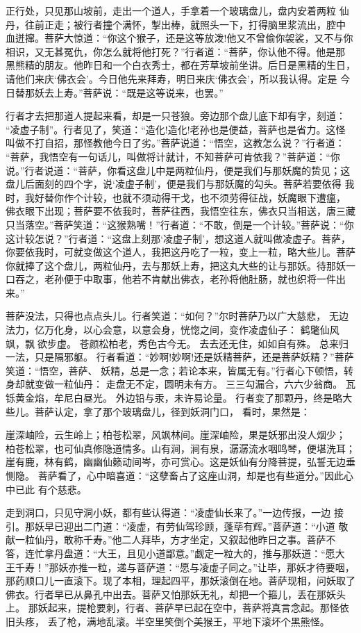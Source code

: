 正行处，只见那山坡前，走出一个道人，手拿着一个玻璃盘儿，盘内安着两粒
仙丹，往前正走；被行者撞个满怀，掣出棒，就照头一下，打得脑里浆流出，腔中
血迸撺。菩萨大惊道：“你这个猴子，还是这等放泼!他又不曾偷你袈裟，又不与你
相识，又无甚冤仇，你怎么就将他打死？”行者道：“菩萨，你认他不得。他是那
黑熊精的朋友。他昨日和一个白衣秀士，都在芳草坡前坐讲。后日是黑精的生日，
请他们来庆‘佛衣会’。今日他先来拜寿，明日来庆‘佛衣会’，所以我认得。定是
今日替那妖去上寿。”菩萨说：“既是这等说来，也罢。”

行者才去把那道人提起来看，却是一只苍狼。旁边那个盘儿底下却有字，刻道：
“凌虚子制”。行者见了，笑道：“造化!造化!老孙也是便益，菩萨也是省力。这怪
叫做不打自招，那怪教他今日了劣。”菩萨说道：“悟空，这教怎么说？”行者道：
“菩萨，我悟空有一句话儿，叫做将计就计，不知菩萨可肯依我？”菩萨道：“你
说。”行者说道：“菩萨，你看这盘儿中是两粒仙丹，便是我们与那妖魔的贽见；这
盘儿后面刻的四个字，说‘凌虚子制’，便是我们与那妖魔的勾头。菩萨若要依得
我时，我好替你作个计较，也就不须动得干戈，也不须劳得征战，妖魔眼下遭瘟，
佛衣眼下出现；菩萨要不依我时，菩萨往西，我悟空往东，佛衣只当相送，唐三藏
只当落空。”菩萨笑道：“这猴熟嘴！”行者道：“不敢，倒是一个计较。”菩萨说：“你
这计较怎说？”行者道：“这盘上刻那‘凌虚子制’，想这道人就叫做凌虚子。菩萨，
你要依我时，可就变做这个道人，我把这丹吃了一粒，变上一粒，略大些儿。菩萨
你就捧了这个盘儿，两粒仙丹，去与那妖上寿，把这丸大些的让与那妖。待那妖一
口吞之，老孙便于中取事，他若不肯献出佛衣，老孙将他肚肠，就也织将一件出来。”

菩萨没法，只得也点点头儿。行者笑道：“如何？”尔时菩萨乃以广大慈悲，
无边法力，亿万化身，以心会意，以意会身，恍惚之间，变作凌虚仙子：
鹤氅仙风飒，飘欲步虚。
苍颜松柏老，秀色古今无。
去去还无住，如如自有殊。
总来归一法，只是隔邪躯。
行者看道：“妙啊!妙啊!还是妖精菩萨，还是菩萨妖精？”菩萨笑道：“悟空，菩萨、
妖精，总是一念；若论本来，皆属无有。”行者心下顿悟，转身却就变做一粒仙丹：
走盘无不定，圆明未有方。
三三勾漏合，六六少翁商。
瓦铄黄金焰，牟尼白昼光。
外边铅与汞，未许易论量。
行者变了那颗丹，终是略大些儿。菩萨认定，拿了那个玻璃盘儿，径到妖洞门口，
看时，果然是：

崖深岫险，云生岭上；柏苍松翠，风飒林间。崖深岫险，果是妖邪出没人烟少；
柏苍松翠，也可仙真修隐道情多。山有涧，涧有泉，潺潺流水咽鸣琴，便堪洗耳；
崖有鹿，林有鹤，幽幽仙籁动间岑，亦可赏心。这是妖仙有分降菩提，弘誓无边垂
恻隐。
菩萨看了，心中暗喜道：“这孽畜占了这座山洞，却是也有些道分。”因此心中已此
有个慈悲。

走到洞口，只见守洞小妖，都有些认得道：“凌虚仙长来了。”一边传报，一边
接引。那妖早已迎出二门道：“凌虚，有劳仙驾珍顾，蓬荜有辉。”菩萨道：“小道
敬献一粒仙丹，敢称千寿。”他二人拜毕，方才坐定，又叙起他昨日之事。菩萨不
答，连忙拿丹盘道：“大王，且见小道鄙意。”觑定一粒大的，推与那妖道：“愿大
王千寿！”那妖亦推一粒，递与菩萨道：“愿与凌虚子同之。”让毕，那妖才待要咽，
那药顺口儿一直滚下。现了本相，理起四平，那妖滚倒在地。菩萨现相，问妖取了
佛衣。行者早已从鼻孔中出去。菩萨又怕那妖无礼，却把一个箍儿，丢在那妖头上。
那妖起来，提枪要刺，行者、菩萨早已起在空中，菩萨将真言念起。那怪依旧头疼，
丢了枪，满地乱滚。半空里笑倒个美猴王，平地下滚坏个黑熊怪。

